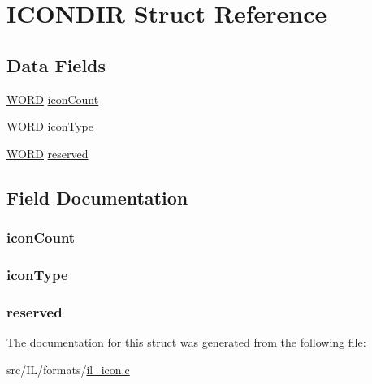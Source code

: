 \hypertarget{struct_i_c_o_n_d_i_r}{\section{I\-C\-O\-N\-D\-I\-R Struct Reference}
\label{struct_i_c_o_n_d_i_r}
}
\subsection*{Data Fields}
\begin{DoxyCompactItemize}
\item 
\hyperlink{il__bmp_8c_a7463aadbea827602ea34f0d93509fa30}{W\-O\-R\-D} \hyperlink{struct_i_c_o_n_d_i_r_a28c7d82193b02d2d43c1f85a6255350e}{icon\-Count}
\item 
\hyperlink{il__bmp_8c_a7463aadbea827602ea34f0d93509fa30}{W\-O\-R\-D} \hyperlink{struct_i_c_o_n_d_i_r_aa933537bb230edbdf63bb3838b95def0}{icon\-Type}
\item 
\hyperlink{il__bmp_8c_a7463aadbea827602ea34f0d93509fa30}{W\-O\-R\-D} \hyperlink{struct_i_c_o_n_d_i_r_a12785364098cd206fdd1745a0c8cb6fe}{reserved}
\end{DoxyCompactItemize}


\subsection{Field Documentation}
\hypertarget{struct_i_c_o_n_d_i_r_a28c7d82193b02d2d43c1f85a6255350e}{
\subsubsection[{icon\-Count}]{ icon\-Count}}\label{struct_i_c_o_n_d_i_r_a28c7d82193b02d2d43c1f85a6255350e}
\hypertarget{struct_i_c_o_n_d_i_r_aa933537bb230edbdf63bb3838b95def0}{
\subsubsection[{icon\-Type}]{ icon\-Type}}\label{struct_i_c_o_n_d_i_r_aa933537bb230edbdf63bb3838b95def0}
\hypertarget{struct_i_c_o_n_d_i_r_a12785364098cd206fdd1745a0c8cb6fe}{
\subsubsection[{reserved}]{ reserved}}\label{struct_i_c_o_n_d_i_r_a12785364098cd206fdd1745a0c8cb6fe}


The documentation for this struct was generated from the following file\-:\begin{DoxyCompactItemize}
\item 
src/\-I\-L/formats/\hyperlink{il__icon_8c}{il\-\_\-icon.\-c}\end{DoxyCompactItemize}
